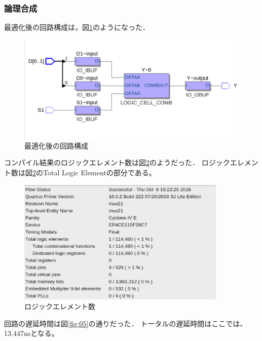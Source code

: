 \documentclass[uplatex]{jsarticle}
\begin{document}
\subsubsection{論理合成}

最適化後の回路構成は，図\ref{fig:03}のようになった．

\begin{figure}[htb]
  \begin{center}
    \includegraphics[width=13cm]{images/fig03.eps}
    \caption{最適化後の回路構成}
    \label{fig:03}
  \end{center}
\end{figure}

コンパイル結果のロジックエレメント数は図\ref{fig:04}のようだった． 
ロジックエレメント数は図\ref{fig:04}のTotal Logic Elementの部分である。

\begin{figure}[htb]
  \begin{center}
    \includegraphics[width=10cm]{images/fig04.eps}
    \caption{ロジックエレメント数}
    \label{fig:04}
  \end{center}
\end{figure}

回路の遅延時間は図\ref{fig:05}の通りだった．
トータルの遅延時間はここでは、13.447nsとなる。
\end{document}
